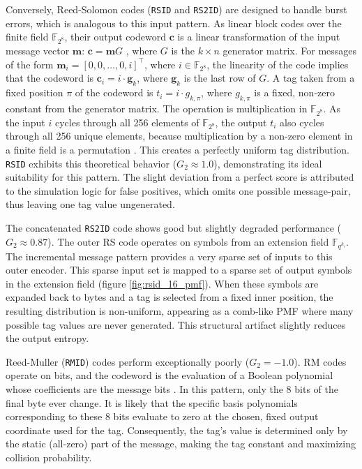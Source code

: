 \documentclass[english,BCOR=4mm,cdfont=false]{tudscrreprt} %
\begin{document}
Conversely, Reed-Solomon codes (\texttt{RSID} and \texttt{RS2ID}) are designed to handle burst errors, which is analogous to this input pattern. As linear block codes over the finite field $\mathbb{F}_{2^8}$, their output codeword $\mathbf{c}$ is a linear transformation of the input message vector $\mathbf{m}$: $\mathbf{c} = \mathbf{m}G$ \cite{macwilliams1977theory}, where $G$ is the $k \times n$ generator matrix. For messages of the form $\mathbf{m}_i = [0, 0, \ldots, 0, i]^\intercal$, where $i \in \mathbb{F}_{2^8}$, the linearity of the code implies that the codeword is $\mathbf{c}_i = i \cdot \mathbf{g}_{k}$, where $\mathbf{g}_{k}$ is the last row of $G$. A tag taken from a fixed position $\pi$ of the codeword is $t_i = i \cdot g_{k, \pi}$, where $g_{k, \pi}$ is a fixed, non-zero constant from the generator matrix. The operation is multiplication in $\mathbb{F}_{2^8}$. As the input $i$ cycles through all 256 elements of $\mathbb{F}_{2^8}$, the output $t_i$ also cycles through all 256 unique elements, because multiplication by a non-zero element in a finite field is a permutation \cite{lidl1997finite}. This creates a perfectly uniform tag distribution. \texttt{RSID} exhibits this theoretical behavior ($G_2 \approx 1.0$), demonstrating its ideal suitability for this pattern. The slight deviation from a perfect score is attributed to the simulation logic for false positives, which omits one possible message-pair, thus leaving one tag value ungenerated.

The concatenated \texttt{RS2ID} code shows good but slightly degraded performance ($G_2 \approx 0.87$). The outer RS code operates on symbols from an extension field $\mathbb{F}_{q^{k_i}}$. The incremental message pattern provides a very sparse set of inputs to this outer encoder. This sparse input set is mapped to a sparse set of output symbols in the extension field (figure \ref{fig:rsid_16_pmf}). When these symbols are expanded back to bytes and a tag is selected from a fixed inner position, the resulting distribution is non-uniform, appearing as a comb-like PMF where many possible tag values are never generated. This structural artifact slightly reduces the output entropy.

Reed-Muller (\texttt{RMID}) codes perform exceptionally poorly ($G_2 = -1.0$). RM codes operate on bits, and the codeword is the evaluation of a Boolean polynomial whose coefficients are the message bits \cite{muller1954application}. In this pattern, only the 8 bits of the final byte ever change. It is likely that the specific basis polynomials corresponding to these 8 bits evaluate to zero at the chosen, fixed output coordinate used for the tag. Consequently, the tag's value is determined only by the static (all-zero) part of the message, making the tag constant and maximizing collision probability.
\end{document}
